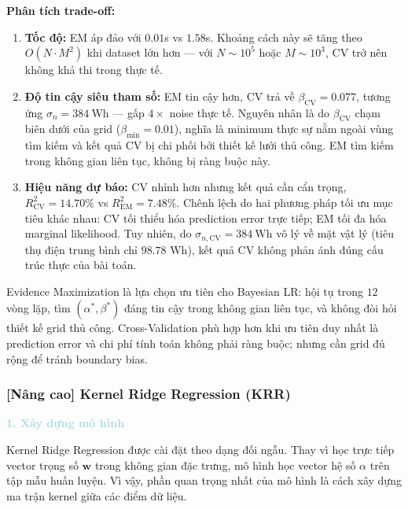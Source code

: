 \textbf{Phân tích trade-off:}
\begin{enumerate}[labelsep=10pt, leftmargin=2cm]
  \item \textbf{Tốc độ:} EM áp đảo với $0.01$s vs $1.58$s.
        Khoảng cách này sẽ tăng theo $O(N \cdot M^2)$ khi dataset lớn hơn ---
        với $N \sim 10^5$ hoặc $M \sim 10^3$, CV trở nên không khả thi trong thực tế.

  \item \textbf{Độ tin cậy siêu tham số:} EM tin cậy hơn,
        CV trả về $\beta_{\text{CV}} = 0.077$, tương ứng $\sigma_n = 384\ \text{Wh}$
        --- gấp $4\times$ noise thực tế. Nguyên nhân là do $\beta_{\text{CV}}$ chạm
        biên dưới của grid ($\beta_{\min} = 0.01$), nghĩa là minimum thực
        sự nằm ngoài vùng tìm kiếm và kết quả CV bị chi phối bởi thiết kế lưới thủ công.
        EM tìm kiếm trong không gian liên tục, không bị ràng buộc này.

  \item \textbf{Hiệu năng dự báo:} CV nhỉnh hơn nhưng kết quả cần cẩn trọng,
        $R^2_{\text{CV}} = 14.70\%$ vs $R^2_{\text{EM}} = 7.48\%$. Chênh lệch do
        hai phương pháp tối ưu mục tiêu khác nhau: CV tối thiểu hóa
        prediction error trực tiếp; EM tối đa hóa marginal likelihood. Tuy nhiên, do $\sigma_{n,\text{CV}} = 384\ \text{Wh}$
        vô lý về mặt vật lý (tiêu thụ điện trung bình chỉ $98.78$ Wh), kết quả CV
        không phản ánh đúng cấu trúc thực của bài toán.
\end{enumerate}

Evidence Maximization là lựa chọn ưu tiên cho Bayesian LR:
hội tụ trong $12$ vòng lặp, tìm $(\alpha^*, \beta^*)$ đáng tin
cậy trong không gian liên tục, và không đòi hỏi thiết kế grid thủ công.
Cross-Validation phù hợp hơn khi ưu tiên duy nhất là prediction error và chi
phí tính toán không phải ràng buộc; nhưng cần grid đủ rộng để tránh boundary bias.

\subsubsection{[Nâng cao] Kernel Ridge Regression (KRR)}

\noindent\textcolor{lightblue}{\textbf{1. Xây dựng mô hình}}

Kernel Ridge Regression được cài đặt theo dạng đối ngẫu. Thay vì học trực tiếp vector trọng số $\mathbf{w}$ trong không gian đặc trưng, mô hình học vector hệ số $\alpha$ trên tập mẫu huấn luyện. Vì vậy, phần quan trọng nhất của mô hình là cách xây dựng ma trận kernel giữa các điểm dữ liệu.


